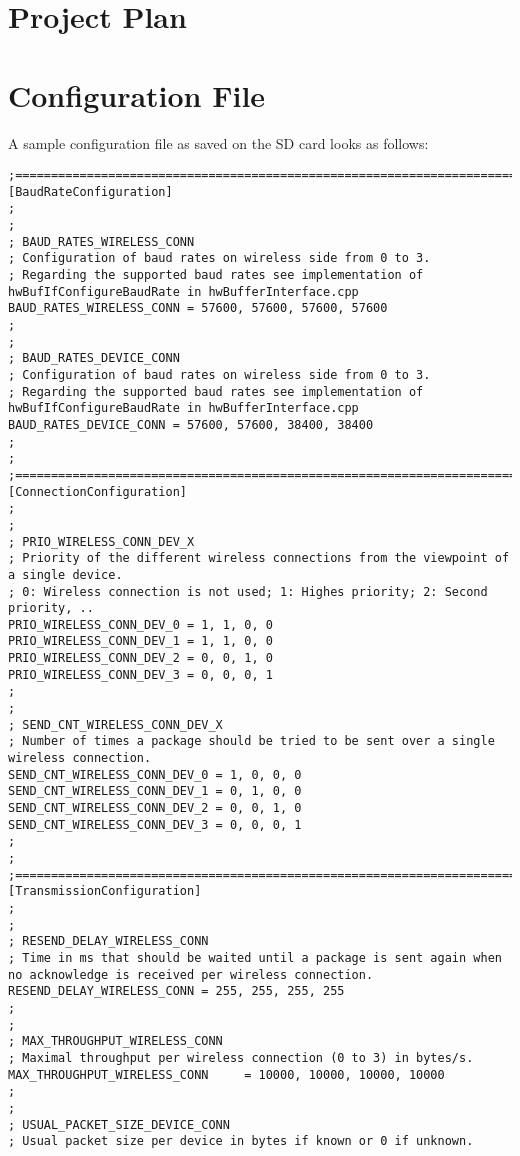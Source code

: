 %
\chapter{Project Plan} \label{app:ProjectPlan}

%
%
%
%
%
%
\chapter{Configuration File}\label{app:txtConfigFile}
A sample configuration file as saved on the SD card looks as follows:
\begin{lstlisting}
;=====================================================================================
[BaudRateConfiguration]
;
;
; BAUD_RATES_WIRELESS_CONN
; Configuration of baud rates on wireless side from 0 to 3.
; Regarding the supported baud rates see implementation of hwBufIfConfigureBaudRate in hwBufferInterface.cpp
BAUD_RATES_WIRELESS_CONN = 57600, 57600, 57600, 57600
;
;
; BAUD_RATES_DEVICE_CONN
; Configuration of baud rates on wireless side from 0 to 3.
; Regarding the supported baud rates see implementation of hwBufIfConfigureBaudRate in hwBufferInterface.cpp
BAUD_RATES_DEVICE_CONN = 57600, 57600, 38400, 38400
;
;
;=====================================================================================
[ConnectionConfiguration]
;
;
; PRIO_WIRELESS_CONN_DEV_X
; Priority of the different wireless connections from the viewpoint of a single device.
; 0: Wireless connection is not used; 1: Highes priority; 2: Second priority, ..
PRIO_WIRELESS_CONN_DEV_0 = 1, 1, 0, 0
PRIO_WIRELESS_CONN_DEV_1 = 1, 1, 0, 0
PRIO_WIRELESS_CONN_DEV_2 = 0, 0, 1, 0
PRIO_WIRELESS_CONN_DEV_3 = 0, 0, 0, 1
;
;
; SEND_CNT_WIRELESS_CONN_DEV_X
; Number of times a package should be tried to be sent over a single wireless connection.
SEND_CNT_WIRELESS_CONN_DEV_0 = 1, 0, 0, 0
SEND_CNT_WIRELESS_CONN_DEV_1 = 0, 1, 0, 0
SEND_CNT_WIRELESS_CONN_DEV_2 = 0, 0, 1, 0
SEND_CNT_WIRELESS_CONN_DEV_3 = 0, 0, 0, 1
;
;
;=====================================================================================
[TransmissionConfiguration]
;
;
; RESEND_DELAY_WIRELESS_CONN
; Time in ms that should be waited until a package is sent again when no acknowledge is received per wireless connection.
RESEND_DELAY_WIRELESS_CONN = 255, 255, 255, 255
;
;
; MAX_THROUGHPUT_WIRELESS_CONN
; Maximal throughput per wireless connection (0 to 3) in bytes/s.
MAX_THROUGHPUT_WIRELESS_CONN	 = 10000, 10000, 10000, 10000
;
;
; USUAL_PACKET_SIZE_DEVICE_CONN
; Usual packet size per device in bytes if known or 0 if unknown.

\end{lstlisting}
